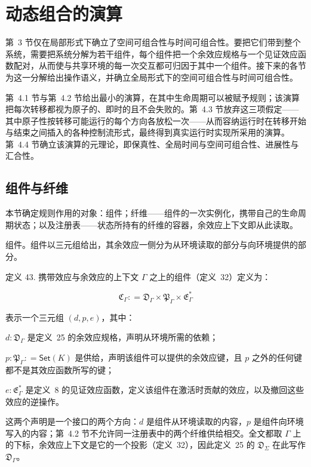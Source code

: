 \documentclass[
  10
]{article}
\begin{document}
\section{动态组合的演算} \label{a-calculus-of-dynamic-composition}

第~3 节仅在局部形式下确立了空间可组合性与时间可组合性。要把它们带到整个系统，需要把系统分解为若干组件，每个组件把一个余效应规格与一个见证效应函数配对，从而使与共享环境的每一次交互都可归因于其中一个组件。接下来的各节为这一分解给出操作语义，并确立全局形式下的空间可组合性与时间可组合性。

第~4.1 节与第~4.2 节给出最小的演算，在其中生命周期可以被赋予规则；该演算把每次转移都视为原子的、即时的且不会失败的。第~4.3 节放弃这三项假定——其中原子性按转移可能运行的每个方向各放松一次——从而容纳运行时在转移开始与结束之间插入的各种控制流形式，最终得到真实运行时实现所采用的演算。第~4.4 节确立该演算的元理论，即保真性、全局时间与空间可组合性、进展性与汇合性。

\subsection{组件与纤维} \label{components-and-fibers}

本节确定规则作用的对象：组件；纤维——组件的一次实例化，携带自己的生命周期状态；以及注册表——状态所持有的纤维的容器，余效应上下文即从此读取。

组件。组件以三元组给出，其余效应一侧分为从环境读取的部分与向环境提供的部分。

定义 43. 携带效应与余效应的上下文 $\Gamma$ 之上的组件（定义~32）定义为：

\[
\mathfrak { C } _ { \Gamma } : = \mathfrak { D } _ { \Gamma } \times \mathfrak { P } _ { \Gamma } \times \mathfrak { E } _ { \Gamma } ^ { * }\tag{37}
\]

表示一个三元组 \(( d , p , e )\)，其中：

\(d : { \mathfrak { D } } _ { \Gamma }\) 是定义~25 的余效应规格，声明从环境所需的依赖；

\(p : \mathfrak { P } _ { \Gamma } : = \mathsf { S e t } ( K )\) 是供给，声明该组件可以提供的余效应键，且 $p$ 之外的任何键都不是其效应函数所写的键；

\(e : { \mathfrak { E } } _ { \Gamma } ^ { * }\) 是定义~8 的见证效应函数，定义该组件在激活时贡献的效应，以及撤回这些效应的逆操作。

这两个声明是一个接口的两个方向：$d$ 是组件从环境读取的内容，$p$ 是组件向环境写入的内容；第~4.2 节不允许同一注册表中的两个纤维供给相交。全文都取 $\Gamma$ 上的下标，余效应上下文是它的一个投影（定义~32），因此定义~25 的 \(\mathfrak { D } _ { \Sigma }\) 在此写作 \(\mathfrak { D } _ { \Gamma }\)。
\end{document}
